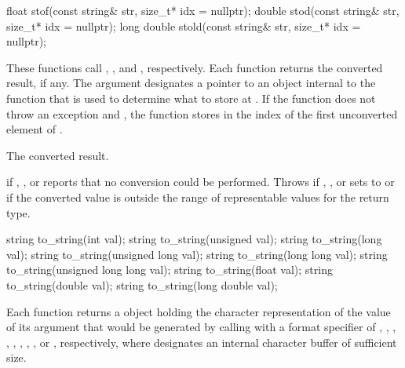 %
%
%
\begin{itemdecl}
float stof(const string& str, size_t* idx = nullptr);
double stod(const string& str, size_t* idx = nullptr);
long double stold(const string& str, size_t* idx = nullptr);
\end{itemdecl}

\begin{itemdescr}
\pnum
\effects These functions call
, , and
, respectively. Each function returns
the converted result, if any. The argument  designates a pointer to
an object internal to the function that is used to determine what to store at
. If the function does not throw an exception and ,
the function stores in  the index of the first unconverted element
of .

\pnum
\returns The converted result.

\pnum
\throws {} if , , or
 reports that no conversion could be performed. Throws
 if , , or
 sets  to 
or if the converted value is outside the range of representable
values for the return type.
\end{itemdescr}

%
\begin{itemdecl}
string to_string(int val);
string to_string(unsigned val);
string to_string(long val);
string to_string(unsigned long val);
string to_string(long long val);
string to_string(unsigned long long val);
string to_string(float val);
string to_string(double val);
string to_string(long double val);
\end{itemdecl}

\begin{itemdescr}
\pnum
\returns Each function returns a  object holding the character
representation of the value of its argument that would be generated by calling
 with a format specifier of
,
,
,
,
,  ,
,
,
or , respectively, where  designates an internal
character buffer of sufficient size.
\end{itemdescr}

